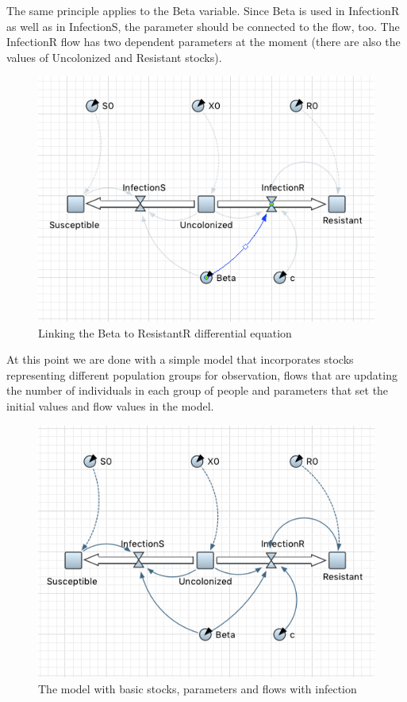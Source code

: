 The same principle applies to the Beta variable. Since Beta is used in InfectionR as well as in InfectionS, the parameter should be connected to the flow, too. The InfectionR flow has two dependent parameters at the moment (there are also the values of Uncolonized and Resistant stocks).

\begin{figure}[H]
  \centering
  \includegraphics[height=0.5\textwidth]{img/screens/basic/basic20}
  \caption{Linking the Beta to ResistantR differential equation}
\end{figure}

At this point we are done with a simple model that incorporates stocks representing different population groups for observation, flows that are updating the number of individuals in each group of people and parameters that set the initial values and flow values in the model.

\begin{figure}[H]
  \centering
  \includegraphics[height=0.5\textwidth]{img/screens/basic/basic21}
  \caption{The model with basic stocks, parameters and flows with infection}
\end{figure}






